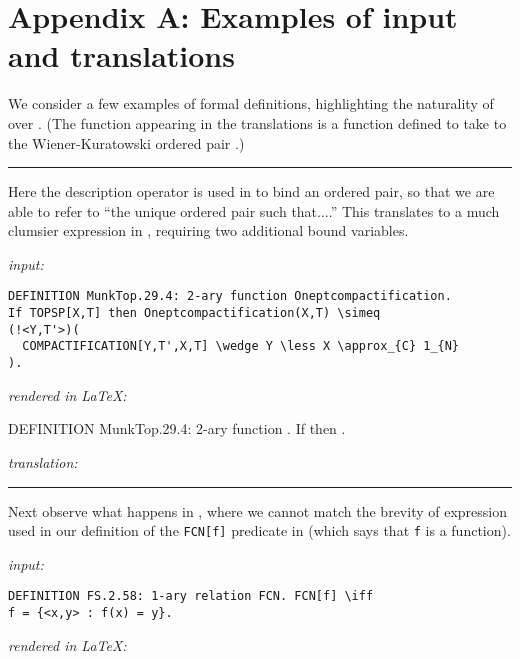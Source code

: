 \documentclass{llncs}
\newcommand{\myrule}{\noindent \rule{\textwidth}{0.3mm}}
\newcommand{\less}{\backslash}
\begin{document}
\section*{Appendix A: Examples of  input and 
  translations} 
\label{PST_DZFC_appendix}

We consider a few examples of formal definitions, highlighting the
naturality of  over . (The  function
appearing in the  translations is a function defined to
take  to the Wiener-Kuratowski ordered pair .)

\smallskip
\myrule

\medskip

 Here the description operator is used in
 to bind an ordered pair, so that we are able to refer to
``the unique ordered pair  such that....'' This
translates to a much clumsier expression in , requiring two
additional bound variables.

\medskip
\noindent \emph{ input:}

\vspace{-2mm}

\begin{verbatim}
DEFINITION MunkTop.29.4: 2-ary function Oneptcompactification.
If TOPSP[X,T] then Oneptcompactification(X,T) \simeq
(!<Y,T'>)(
  COMPACTIFICATION[Y,T',X,T] \wedge Y \less X \approx_{C} 1_{N}
).
\end{verbatim}

\noindent \emph{ rendered in \LaTeX{}:}

\medskip
\noindent DEFINITION MunkTop.29.4: 2-ary function
. If \hfil\break 
then  \hfil\break .

\bigskip
\noindent \emph{ translation:}

\medskip
\noindent 

\myrule

\medskip
{} Next observe what happens in ,
where we cannot match the brevity of expression used in our definition
of the {\tt FCN[f]} predicate in  (which says that {\tt f}
is a function).

\bigskip
\noindent \emph{ input:}

\vspace{-2mm}

\begin{verbatim}
DEFINITION FS.2.58: 1-ary relation FCN. FCN[f] \iff
f = {<x,y> : f(x) = y}.
\end{verbatim}

\noindent  \emph{ rendered in \LaTeX{}:}
\end{document}
